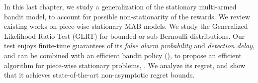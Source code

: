 In this last chapter, we study a generalization of the stationary multi-armed bandit model,
to account for possible non-stationarity of the rewards.
%
We review existing works on piece-wise stationary MAB models.
%
We study the Generalized Likelihood Ratio Test (GLRT) for
bounded or sub-Bernoulli distributions.
Our test enjoys finite-time guarantees
%
of its \emph{false alarm probability} and \emph{detection delay}, and can be combined with an efficient bandit policy (\klUCB), to propose an efficient algorithm for piece-wise stationary problems, \GLRklUCB.
%
We analyze its regret, and show that it achieves state-of-the-art non-asymptotic regret bounds.
